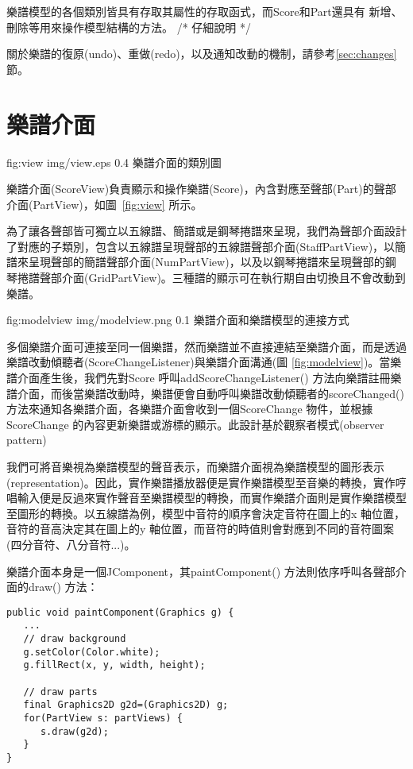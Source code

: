 \documentclass[12pt,a4paper,oneside]{report}
\begin{document}
樂譜模型的各個類別皆具有存取其屬性的存取函式，而Score和Part還具有
新增、刪除等用來操作模型結構的方法。 /*  
仔細說明  
*/

關於樂譜的復原(undo)、重做(redo)，以及通知改動的機制，請參考\ref{sec:changes} 節。


\section{樂譜介面} %


\figurewithcaption
{fig:view}
{img/view.eps}
{0.4}
{樂譜介面的類別圖}

樂譜介面(ScoreView)負責顯示和操作樂譜(Score)，內含對應至聲部(Part)的聲部介面(PartView)，如圖~\ref{fig:view} 所示。

為了讓各聲部皆可獨立以五線譜、簡譜或是鋼琴捲譜來呈現，我們為聲部介面設計了對應的子類別，包含以五線譜呈現聲部的五線譜聲部介面(StaffPartView)，以簡譜來呈現聲部的簡譜聲部介面(NumPartView)，以及以鋼琴捲譜來呈現聲部的鋼琴捲譜聲部介面(GridPartView)。三種譜的顯示可在執行期自由切換且不會改動到樂譜。


\figurewithcaption
{fig:modelview}
{img/modelview.png}
{0.1}
{樂譜介面和樂譜模型的連接方式}

多個樂譜介面可連接至同一個樂譜，然而樂譜並不直接連結至樂譜介面，而是透過樂譜改動傾聽者(ScoreChangeListener)與樂譜介面溝通(圖 \ref{fig:modelview})。當樂譜介面產生後，我們先對Score 呼叫addScoreChangeListener() 方法向樂譜註冊樂譜介面，而後當樂譜改動時，樂譜便會自動呼叫樂譜改動傾聽者的scoreChanged() 方法來通知各樂譜介面，各樂譜介面會收到一個ScoreChange 物件，並根據ScoreChange 的內容更新樂譜或游標的顯示。此設計基於觀察者模式(observer pattern)\cite{designPatterns}

我們可將音樂視為樂譜模型的聲音表示，而樂譜介面視為樂譜模型的圖形表示(representation)。因此，實作樂譜播放器便是實作樂譜模型至音樂的轉換，實作哼唱輸入便是反過來實作聲音至樂譜模型的轉換，而實作樂譜介面則是實作樂譜模型至圖形的轉換。以五線譜為例，模型中音符的順序會決定音符在圖上的x 軸位置，音符的音高決定其在圖上的y 軸位置，而音符的時值則會對應到不同的音符圖案(四分音符、八分音符...)。

樂譜介面本身是一個JComponent，其paintComponent() 方法則依序呼叫各聲部介面的draw() 方法：

\begin{lstlisting}
public void paintComponent(Graphics g) {
   ...
   // draw background
   g.setColor(Color.white);
   g.fillRect(x, y, width, height);

   // draw parts
   final Graphics2D g2d=(Graphics2D) g;
   for(PartView s: partViews) {
      s.draw(g2d);  
   }
}
\end{lstlisting}
\end{document}
